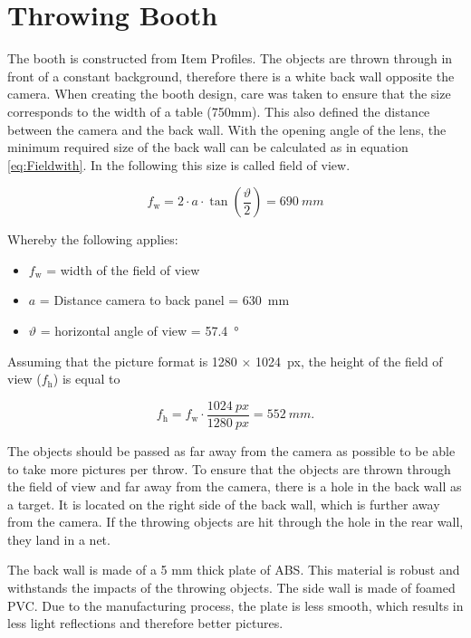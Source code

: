 \section{Throwing Booth}
\label{sec:booth}
The booth is constructed from Item Profiles.
The objects are thrown through in front of a constant background, therefore there is a white back wall opposite the camera.
When creating the booth design, care was taken to ensure that the size corresponds to the width of a table (750mm).
This also defined the distance between the camera and the back wall.
With the opening angle of the lens, the minimum required size of the back wall can be calculated as in equation \ref{eq:Fieldwith}. 
In the following this size is called field of view.

\begin{equation}
	f_\text{w} = 2 \cdot a \cdot \tan\left( \frac{\vartheta}{2}\right) = \SI{690}{mm}
	\label{eq:Fieldwith}
\end{equation}

Whereby the following applies:
\begin{itemize}
	\item $f_\text{w}$ = width of the field of view
	\item $a$ = Distance camera to back panel = \SI{630}{mm}
	\item $\vartheta$ = horizontal angle of view = \SI{57.4}{\degree} \cite{baumer_lense}
\end{itemize}

Assuming that the picture format is 1280 $\times$ \SI{1024}{px}, the height of the field of view ($f_\text{h}$) is equal to

\begin{equation}
	f_\text{h} = f_\text{w} \cdot \frac{\SI{1024}{px}}{\SI{1280}{px}} = \SI{552}{mm}.
	\label{eq:Fieldhight}
\end{equation}

The objects should be passed as far away from the camera as possible to be able to take more pictures per throw.
To ensure that the objects are thrown through the field of view and far away from the camera, there is a hole in the back wall as a target.
It is located on the right side of the back wall, which is further away from the camera.
If the throwing objects are hit through the hole in the rear wall, they land in a net.

The back wall is made of a 5 mm thick plate of ABS.
This material is robust and withstands the impacts of the throwing objects.
The side wall is made of foamed PVC.
Due to the manufacturing process, the plate is less smooth, which results in less light reflections and therefore better pictures.

